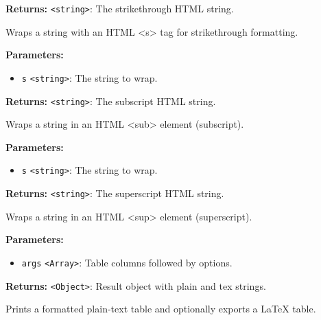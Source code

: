 \documentclass[12pt,a4paper]{article}
\begin{document}
\noindent \textbf{Returns:} \texttt{<string>}: The strikethrough HTML string.

\noindent Wraps a string with an HTML <s> tag for strikethrough formatting.

\vspace{5mm}
\noindent {}


\noindent \textbf{Parameters:}
\begin{itemize}
  \item \texttt{s} \texttt{<string>}: The string to wrap.
\end{itemize}

\noindent \textbf{Returns:} \texttt{<string>}: The subscript HTML string.

\noindent Wraps a string in an HTML <sub> element (subscript).

\vspace{5mm}
\noindent {}


\noindent \textbf{Parameters:}
\begin{itemize}
  \item \texttt{s} \texttt{<string>}: The string to wrap.
\end{itemize}

\noindent \textbf{Returns:} \texttt{<string>}: The superscript HTML string.

\noindent Wraps a string in an HTML <sup> element (superscript).

\vspace{5mm}
\noindent {}


\noindent \textbf{Parameters:}
\begin{itemize}
  \item \texttt{args} \texttt{<Array>}: Table columns followed by options.
\end{itemize}

\noindent \textbf{Returns:} \texttt{<Object>}: Result object with \textasciigrave{}plain\textasciigrave{} and \textasciigrave{}tex\textasciigrave{} strings.

\noindent Prints a formatted plain-text table and optionally exports a LaTeX table.
\end{document}
